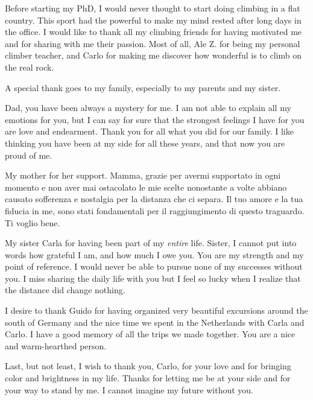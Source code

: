 Before starting my PhD, I would never thought to start doing climbing in a flat country. This sport had the powerful to make my mind rested after long days in the office.
I would like to thank all my climbing friends for having motivated me and for sharing with me their passion. Most of all, Ale Z. for being my personal climber teacher, and Carlo for making me discover how wonderful is to climb on the real rock. 

A special thank goes to my family, especially to my parents and my sister.

Dad, you have been always a mystery for me. I am not able to explain all my emotions for you, but I can say for sure that the strongest feelings I have for you are love and endearment. Thank you for all what you did for our family. I like thinking you have been at my side for all these years, and that now you are proud of me.

My mother for her support. Mamma, grazie per avermi supportato in ogni momento e non aver mai ostacolato le mie scelte nonostante a volte abbiano causato sofferenza e nostalgia per la distanza che ci separa. Il tuo amore e la tua fiducia in me, sono stati fondamentali per il raggiungimento di questo traguardo. Ti voglio bene.   

My sister Carla for having been part of my \textit{entire} life. Sister, I cannot put into words how grateful I am, and how much I owe you. You are my strength and my point of reference. I would never be able to pursue none of my successes without you.
I miss sharing the daily life with you but I feel so lucky when I realize that the distance did change nothing. 

I desire to thank Guido for having organized very beautiful excursions around the south of Germany and the nice time we spent in the Netherlands with Carla and Carlo. I have a good memory of all the trips we made together. You are a nice and warm-hearthed person.

Last, but not least, I wish to thank you, Carlo, for your love and for bringing color and brightness in my life.
Thanks for letting me be at your side and for your way to stand by me. I cannot imagine my future without you.
